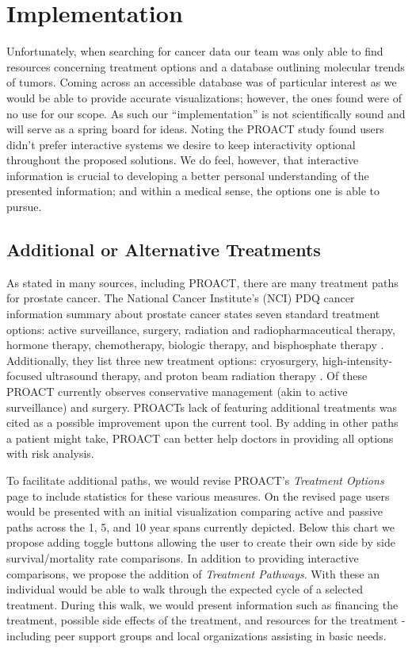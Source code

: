 \documentclass[journal]{vgtc}                %
\begin{document}
\section{Implementation}
        Unfortunately, when searching for cancer data our team was only able to find resources concerning treatment options and a database outlining molecular trends of tumors.
        Coming across an accessible database was of particular interest as we would be able to provide accurate visualizations; however, the ones found were of no use for our scope.
        As such our ``implementation'' is not scientifically sound and will serve as a spring board for ideas.
        Noting the PROACT study found users didn't prefer interactive systems we desire to keep interactivity optional throughout the proposed solutions.
        We do feel, however, that interactive information is crucial to developing a better personal understanding of the presented information; and within a medical sense, the options one is able to pursue.

        \subsection{Additional or Alternative Treatments}
                As stated in many sources, including PROACT, there are many treatment paths for prostate cancer.
                The National Cancer Institute's (NCI) PDQ cancer information summary about prostate cancer states seven standard treatment options: active surveillance, surgery, radiation and radiopharmaceutical therapy, hormone therapy, chemotherapy, biologic therapy, and bisphosphate therapy \cite{PDQProstateCancer:2016}.
                Additionally, they list three new treatment options: cryosurgery, high-intensity-focused ultrasound therapy, and proton beam radiation therapy \cite{PDQProstateCancer:2016}.
                Of these PROACT currently observes conservative management (akin to active surveillance) and surgery.
                PROACTs lack of featuring additional treatments was cited as a possible improvement upon the current tool.
                By adding in other paths a patient might take, PROACT can better help doctors in providing all options with risk analysis.

                To facilitate additional paths, we would revise PROACT's \textit{Treatment Options} page to include statistics for these various measures.
                On the revised page users would be presented with an initial visualization comparing active and passive paths across the 1, 5, and 10 year spans currently depicted.
                Below this chart we propose adding toggle buttons allowing the user to create their own side by side survival/mortality rate comparisons.
                In addition to providing interactive comparisons, we propose the addition of \textit{Treatment Pathways}.
                With these an individual would be able to walk through the expected cycle of a selected treatment.
                During this walk, we would present information such as financing the treatment, possible side effects of the treatment, and resources for the treatment - including peer support groups and local organizations assisting in basic needs.
\end{document}
